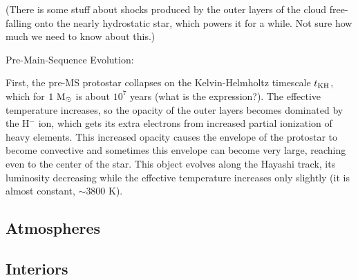 (There is some stuff about shocks produced by the outer layers of the cloud free-falling onto the nearly hydrostatic star, which powers it for a while. Not sure how much we need to know about this.)

Pre-Main-Sequence Evolution:

First, the pre-MS protostar collapses on the Kelvin-Helmholtz timescale $t_{\rm KH}$, which for $1~{\rm M}_\odot$ is about $10^7$ years (what is the expression?). The effective temperature increases, so the opacity of the outer layers becomes dominated by the H$^-$ ion, which gets its extra electrons from increased partial ionization of heavy elements. This increased opacity causes the envelope of the protostar to become convective and sometimes this envelope can become very large, reaching even to the center of the star. This object evolves along the Hayashi track, its luminosity decreasing while the effective temperature increases only slightly (it is almost constant, $\sim 3800$ K).

\subsection{Atmospheres}
\subsection{Interiors}






